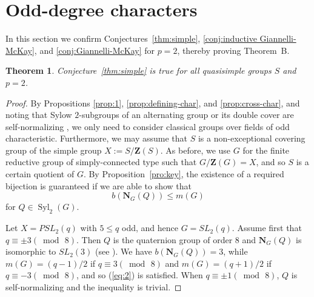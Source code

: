 \documentclass[12pt]{amsart}
\theoremstyle{plain}
\newtheorem{thm}{Theorem}[section]
\theoremstyle{definition}
\numberwithin{equation}{section}
\newcommand{\Syl}{\operatorname{Syl}}
\newcommand{\bN}{\mathbf{N}}
\newcommand{\bZ}{{\mathbf{Z}}}
\begin{document}

\section{Odd-degree characters}\label{sec:p=2}

In this section we confirm Conjectures~\ref{thm:simple},
\ref{conj:inductive Giannelli-McKay}, and \ref{conj:Giannelli-McKay}
for $p=2$, thereby proving Theorem~B.

\begin{thm}\label{thm:p=2}
Conjecture~\ref{thm:simple} is true for all quasisimple groups $S$
and $p=2$.
\end{thm}

\begin{proof}
By Propositions \ref{prop:1}, \ref{prop:defining-char}, and
\ref{prop:cross-char}, and noting that Sylow $2$-subgroups of an
alternating group or its double cover are self-normalizing
\cite{Olsson76}, we only need to consider classical groups over
fields of odd characteristic. Furthermore, we may assume that $S$ is
a non-exceptional covering group of the simple group $X:=S/\bZ(S)$.
As before, we use $G$ for the finite reductive group of
simply-connected type such that $G/\bZ(G)=X$, and so $S$ is a
certain quotient of $G$. By Proposition~\ref{pro:key}, the existence
of a required bijection is guaranteed if we are able to show that
\begin{equation}\label{eq:2}b(\bN_G(Q))\leq m(G)\end{equation} for $Q\in\Syl_2(G)$.

Let $X=PSL_2(q)$ with $5\leq q$ odd, and hence $G=SL_2(q)$. Assume
first that $q\equiv \pm 3(\bmod\,8)$. Then $Q$ is the quaternion
group of order $8$ and $\bN_G(Q)$ is isomorphic to $SL_2(3)$ (see
\cite[\S15E]{IMN07}). We have $b(\bN_G(Q))=3$, while $m(G)=(q-1)/2$
if $q\equiv 3(\bmod\,8)$ and $m(G)=(q+1)/2$ if $q\equiv
-3(\bmod\,8)$, and so (\ref{eq:2}) is satisfied. When $q\equiv \pm
1(\bmod\,8)$, $Q$ is self-normalizing and the inequality is trivial.


\end{proof}
\end{document}

